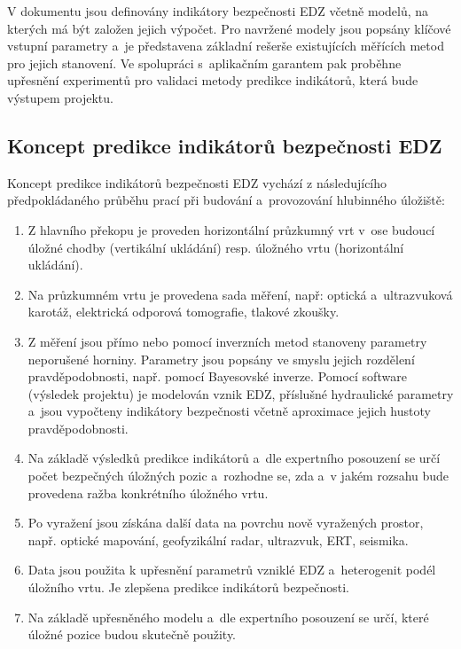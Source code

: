 \documentclass{article}
\def\todo#1{}
\def\jb#1{}
\newcommand{\pe}[1]{}
\begin{document}


V dokumentu jsou definovány indikátory bezpečnosti EDZ včetně modelů, na kterých 
má být založen jejich výpočet. Pro navržené modely jsou popsány klíčové vstupní 
parametry a~je představena základní rešerše existujících měřících metod pro jejich
stanovení. Ve spolupráci s~aplikačním garantem pak proběhne upřesnění 
experimentů pro validaci metody predikce indikátorů, která bude výstupem projektu.  



\subsection{Koncept predikce indikátorů bezpečnosti EDZ}



Koncept predikce indikátorů bezpečnosti EDZ vychází z následujícího předpokládaného průběhu prací 
při budování a~provozování hlubinného úložiště:
\begin{enumerate}
    \item Z hlavního překopu je proveden horizontální průzkumný vrt v~ose budoucí úložné chodby
        (vertikální ukládání) resp. úložného vrtu (horizontální ukládání).
    \item Na průzkumném vrtu je provedena sada měření, 
          např: optická a~ultrazvuková karotáž, elektrická odporová tomografie, tlakové zkoušky.

    \item \label{item_model1}
        Z měření jsou přímo nebo pomocí inverzních metod stanoveny parametry neporušené horniny.
        Parametry jsou popsány ve smyslu jejich rozdělení pravděpodobnosti, 
        např. pomocí Bayesovské inverze. Pomocí software (výsledek projektu) je modelován vznik EDZ,
        příslušné hydraulické parametry a~jsou vypočteny indikátory bezpečnosti včetně aproximace 
        jejich hustoty pravděpodobnosti.
    \item Na základě výsledků predikce indikátorů a~dle expertního posouzení se určí počet bezpečných
        úložných pozic a~rozhodne se, zda a~v jakém rozsahu bude provedena ražba  konkrétního úložného vrtu.
    \item Po vyražení jsou získána další data na povrchu nově vyražených prostor, např. optické mapování, 
        geofyzikální radar, ultrazvuk, ERT, seismika. 
    \item Data jsou použita k upřesnění parametrů vzniklé EDZ a~heterogenit podél úložního vrtu. 
        Je zlepšena predikce indikátorů bezpečnosti.  
    \item \label{item_model2}
        Na základě upřesněného modelu a~dle expertního posouzení se určí, které úložné pozice budou 
        skutečně použity.
\end{enumerate}
\end{document}
